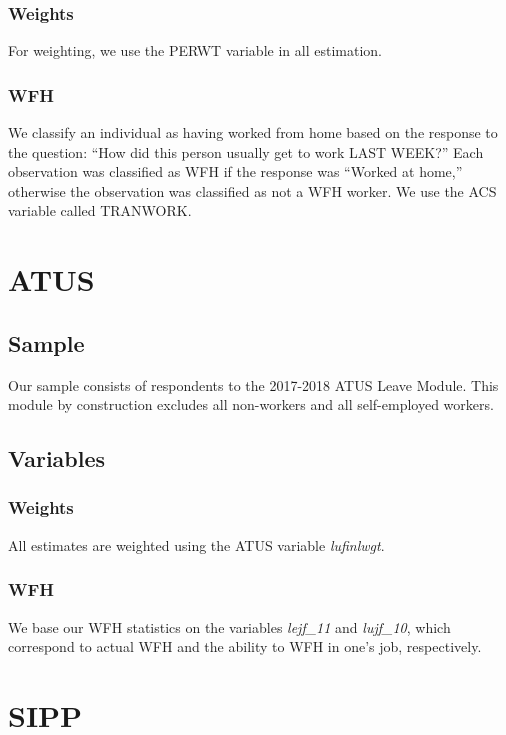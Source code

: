 \documentclass{article}
\begin{document}
\subsubsection{Weights}
For weighting, we use the PERWT variable in all estimation.

\subsubsection{WFH}
We classify an individual as having worked from home based on the response to the question: ``How did this person usually get to work LAST WEEK?''
Each observation was classified as WFH if the response was ``Worked at home,'' otherwise the observation was classified as not a WFH worker.
We use the ACS variable called TRANWORK.

\section{ATUS}

\subsection{Sample}
Our sample consists of respondents to the 2017-2018 ATUS Leave Module. This module by construction excludes all non-workers and all self-employed workers.

\subsection{Variables}

\subsubsection{Weights}
All estimates are weighted using the ATUS variable \emph{lufinlwgt}.

\subsubsection{WFH}
We base our WFH statistics on the variables \emph{lejf\_11} and \emph{lujf\_10}, which correspond to actual WFH and the ability to WFH in one's job, respectively.

\section{SIPP}
\end{document}
